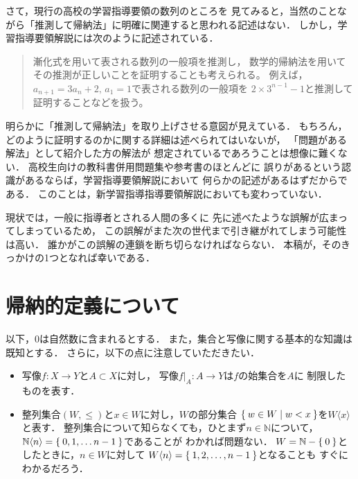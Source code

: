 \documentclass[11pt,a4paper]{ltjsarticle} %
\theoremstyle{mystyle} %
\begin{document}
さて，現行の高校の学習指導要領\cite{youryou}の数列のところを
見てみると，当然のことながら「推測して帰納法」に明確に関連すると思われる記述はない．
しかし，学習指導要領解説\cite{youryoukai}には次のように記述されている．

\begin{quote}
	漸化式を用いて表される数列の一般項を推測し，
	数学的帰納法を用いてその推測が正しいことを証明することも考えられる。
	例えば，$a_{n+1} = 3 a_n + 2 , \, a_1=1$で表される数列の一般項を
	$2 \times 3^{n-1} -1 $と推測して証明することなどを扱う。
\end{quote}

明らかに「推測して帰納法」を取り上げさせる意図が見えている．
もちろん，どのように証明するのかに関する詳細は述べられてはいないが，
「問題がある解法」として紹介した方の解法が
想定されているであろうことは想像に難くない．
高校生向けの教科書併用問題集や参考書のほとんどに
誤りがあるという認識があるならば，学習指導要領解説において
何らかの記述があるはずだからである．
このことは，新学習指導指導要領解説においても変わっていない．


現状では，一般に指導者とされる人間の多くに
先に述べたような誤解が広まってしまっているため，
この誤解がまた次の世代まで引き継がれてしまう可能性は高い．
誰かがこの誤解の連鎖を断ち切らなければならない．
本稿が，そのきっかけの1つとなれば幸いである．




\section{帰納的定義について}


以下，$0$は自然数に含まれるとする．
また，集合と写像に関する基本的な知識は既知とする．
さらに，以下の点に注意していただきたい．
\begin{itemize}
	\item 写像$f \colon X \longrightarrow Y$と$A \subset X$に対し，
	      写像$f|_A \colon A \longrightarrow Y$は$f$の始集合を$A$に
	      制限したものを表す．
	\item 整列集合$(W, \leq)$と$x \in W$に対し，$W$の部分集合
	      $\Set{ w \in W \mid w < x}$を$W \langle x \rangle$と表す．
	      整列集合について知らなくても，ひとまず$n \in \mathbb{N}$について，
	      $\mathbb{N} \langle n \rangle = \Set{ 0,1, \ldots n-1}$であることが
	      わかれば問題ない．
	      $W = \mathbb{N} - \Set{0}$としたときに，$n \in W$に対して
	      $W \langle n \rangle = \Set{1,2, \ldots, n-1}$となることも
	      すぐにわかるだろう．
\end{itemize}
\end{document}
